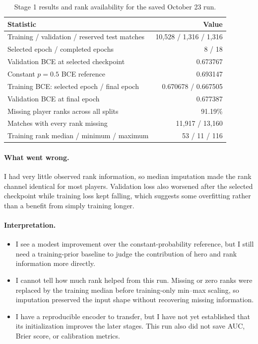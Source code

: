 \documentclass[11pt]{article}
\begin{document}
    \begin{table}[H]
    \centering
    \small
    \renewcommand{\arraystretch}{1.15}
    \begin{tabularx}{\textwidth}{>{\raggedright\arraybackslash}X r}
    \toprule
    \textbf{Statistic} & \textbf{Value} \\
    \midrule
    Training / validation / reserved test matches & 10,528 / 1,316 / 1,316 \\
    Selected epoch / completed epochs & 8 / 18 \\
    Validation BCE at selected checkpoint & 0.673767 \\
    Constant $p=0.5$ BCE reference & 0.693147 \\
    Training BCE: selected epoch / final epoch & 0.670678 / 0.667505 \\
    Validation BCE at final epoch & 0.677387 \\
    Missing player ranks across all splits & 91.19\% \\
    Matches with every rank missing & 11,917 / 13,160 \\
    Training rank median / minimum / maximum & 53 / 11 / 116 \\
    \bottomrule
    \end{tabularx}
    \caption{Stage 1 results and rank availability for the saved October 23 run.}
    \label{tab:static-results}
    \end{table}

    \paragraph{What went wrong.}
    I had very little observed rank information, so median imputation made the
    rank channel identical for most players. Validation loss also worsened after
    the selected checkpoint while training loss kept falling, which suggests
    some overfitting rather than a benefit from simply training longer.

    \paragraph{Interpretation.}
    \begin{itemize}
        \item I see a modest improvement over the constant-probability reference,
        but I still need a training-prior baseline to judge the contribution of
        hero and rank information more directly.
        \item I cannot tell how much rank helped from this run. Missing or zero
        ranks were replaced by the training median before training-only min--max
        scaling, so imputation preserved the input shape without recovering
        missing information.
        \item I have a reproducible encoder to transfer, but I have not yet
        established that its initialization improves the later stages. This
        run also did not save AUC, Brier score, or calibration metrics.
    \end{itemize}
\end{document}

